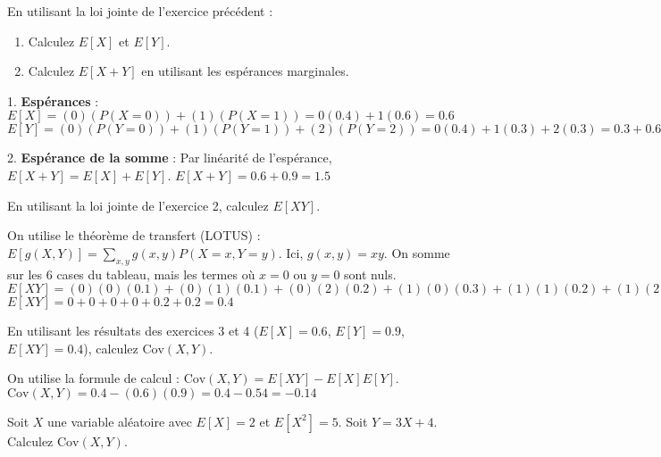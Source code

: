 \begin{exercicebox}
En utilisant la loi jointe de l'exercice précédent :
\begin{enumerate}
    \item Calculez $E[X]$ et $E[Y]$.
    \item Calculez $E[X+Y]$ en utilisant les espérances marginales.
\end{enumerate}
\end{exercicebox}

\begin{correctionbox}
1. \textbf{Espérances} :
$E[X] = (0)(P(X=0)) + (1)(P(X=1)) = 0(0.4) + 1(0.6) = 0.6$
$E[Y] = (0)(P(Y=0)) + (1)(P(Y=1)) + (2)(P(Y=2)) = 0(0.4) + 1(0.3) + 2(0.3) = 0.3 + 0.6 = 0.9$

2. \textbf{Espérance de la somme} :
Par linéarité de l'espérance, $E[X+Y] = E[X] + E[Y]$.
$E[X+Y] = 0.6 + 0.9 = 1.5$
\end{correctionbox}

\begin{exercicebox}
En utilisant la loi jointe de l'exercice 2, calculez $E[XY]$.
\end{exercicebox}

\begin{correctionbox}
On utilise le théorème de transfert (LOTUS) : $E[g(X,Y)] = \sum_{x,y} g(x,y) P(X=x, Y=y)$.
Ici, $g(x,y) = xy$. On somme sur les 6 cases du tableau, mais les termes où $x=0$ ou $y=0$ sont nuls.
$E[XY] = (0)(0)(0.1) + (0)(1)(0.1) + (0)(2)(0.2) + (1)(0)(0.3) + (1)(1)(0.2) + (1)(2)(0.1)$
$E[XY] = 0 + 0 + 0 + 0 + 0.2 + 0.2 = 0.4$
\end{correctionbox}

\begin{exercicebox}[Covariance - 1]
En utilisant les résultats des exercices 3 et 4 ($E[X]=0.6$, $E[Y]=0.9$, $E[XY]=0.4$), calculez $\text{Cov}(X,Y)$.
\end{exercicebox}

\begin{correctionbox}
On utilise la formule de calcul : $\text{Cov}(X,Y) = E[XY] - E[X]E[Y]$.
$\text{Cov}(X,Y) = 0.4 - (0.6)(0.9) = 0.4 - 0.54 = -0.14$
\end{correctionbox}

\begin{exercicebox}[Covariance - 2]
Soit $X$ une variable aléatoire avec $E[X]=2$ et $E[X^2]=5$. Soit $Y = 3X + 4$.
Calculez $\text{Cov}(X,Y)$.
\end{exercicebox}

